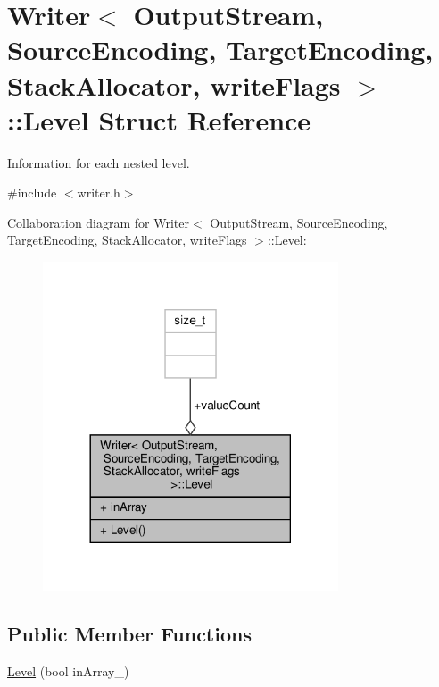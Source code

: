 \hypertarget{structWriter_1_1Level}{}\section{Writer$<$ Output\+Stream, Source\+Encoding, Target\+Encoding, Stack\+Allocator, write\+Flags $>$\+:\+:Level Struct Reference}
\label{structWriter_1_1Level}


Information for each nested level.  




{\ttfamily \#include $<$writer.\+h$>$}



Collaboration diagram for Writer$<$ Output\+Stream, Source\+Encoding, Target\+Encoding, Stack\+Allocator, write\+Flags $>$\+:\+:Level\+:
\nopagebreak
\begin{figure}[H]
\begin{center}
\leavevmode
\includegraphics[width=248pt]{structWriter_1_1Level__coll__graph}
\end{center}
\end{figure}
\subsection*{Public Member Functions}
\begin{DoxyCompactItemize}
\item 
\hyperlink{structWriter_1_1Level_a0b1844a7a1b7c6c20e1964dbb67da484}{Level} (bool in\+Array\+\_\+)
\end{DoxyCompactItemize}
